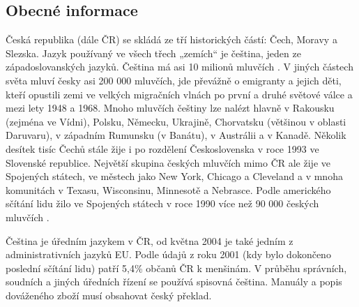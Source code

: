 
\begin{multicols}{2}
  \subsection{Obecné informace}

Česká republika (dále ČR) se skládá ze tří historických částí: Čech, Moravy a Slezska. Jazyk používaný ve všech třech „zemích“ je čeština, jeden ze západoslovanských jazyků. Čeština má asi 10 milionů mluvčích \cite{Note1_cs}. V jiných částech světa mluví česky asi 200 000 mluvčích, jde převážně o emigranty a jejich děti, kteří opustili zemi ve velkých migračních vlnách po první a druhé světové válce a mezi lety 1948 a 1968. Mnoho mluvčích češtiny lze nalézt hlavně v Rakousku (zejména ve Vídni), Polsku, Německu, Ukrajině, Chorvatsku (většinou v oblasti Daruvaru), v západním Rumunsku (v Banátu), v Austrálii a v Kanadě. Několik desítek tisíc Čechů stále žije i po rozdělení Československa v roce 1993 ve Slovenské republice. Největší skupina českých mluvčích mimo ČR ale žije ve Spojených státech, ve městech jako New York, Chicago a Cleveland a v mnoha komunitách v Texasu, Wisconsinu, Minnesotě a Nebrasce. Podle amerického sčítání lidu žilo ve Spojených státech v roce 1990 více než 90 000 českých mluvčích \cite{Note2}.

Čeština je úředním jazykem v ČR, od května 2004 je také jedním z administrativních jazyků EU. Podle údajů z roku 2001 (kdy bylo dokončeno poslední sčítání lidu) patří 5,4\% občanů ČR k menšinám. V průběhu správních, soudních a jiných úředních řízení se používá spisovná čeština. Manuály a popis dováženého zboží musí obsahovat český překlad.


\end{multicols}
